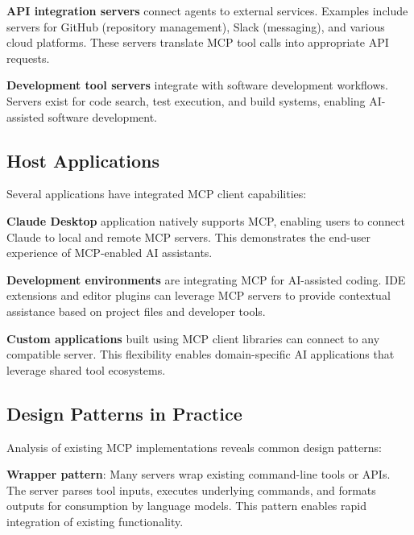 \textbf{API integration servers} connect agents to external services. Examples include servers for GitHub (repository management), Slack (messaging), and various cloud platforms. These servers translate MCP tool calls into appropriate API requests.

\textbf{Development tool servers} integrate with software development workflows. Servers exist for code search, test execution, and build systems, enabling AI-assisted software development.


\subsection{Host Applications}

Several applications have integrated MCP client capabilities:

\textbf{Claude Desktop} application natively supports MCP, enabling users to connect Claude to local and remote MCP servers. This demonstrates the end-user experience of MCP-enabled AI assistants.

\textbf{Development environments} are integrating MCP for AI-assisted coding. IDE extensions and editor plugins can leverage MCP servers to provide contextual assistance based on project files and developer tools.

\textbf{Custom applications} built using MCP client libraries can connect to any compatible server. This flexibility enables domain-specific AI applications that leverage shared tool ecosystems.

\subsection{Design Patterns in Practice}

Analysis of existing MCP implementations reveals common design patterns:

\textbf{Wrapper pattern}: Many servers wrap existing command-line tools or APIs. The server parses tool inputs, executes underlying commands, and formats outputs for consumption by language models. This pattern enables rapid integration of existing functionality.

